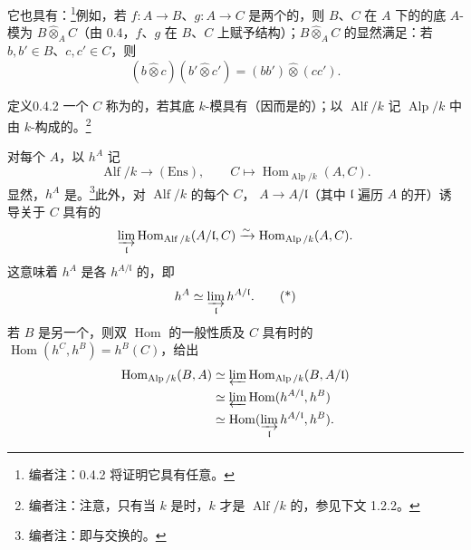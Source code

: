 它也具有：\footnote{编者注：0.4.2 将证明它具有任意。}例如，若 $f:A\to B$、$g:A\to C$ 是两个的，则 $B$、$C$ 在 $A$ 下的的底 $A$-模为 $B\widehat\otimes_A C$（由 0.4，$f$、$g$
在 $B$、$C$ 上赋予结构）；$B\widehat\otimes_A C$ 的显然满足：若 $b,b'\in B$、$c,c'\in C$，则
\[(b\widehat\otimes c)(b'\widehat\otimes c')=(bb')\widehat\otimes(cc').\]

\begin{SGAresult}{定义}{0.4.2}
一个 $C$ 称为的，若其底 $k$-模具有（因而是的）；以 $\operatorname{Alf}/k$ 记 $\operatorname{Alp}/k$ 中由 $k$-构成的。\footnote{编者注：注意，只有当 $k$ 是时，$k$ 才是 $\operatorname{Alf}/k$ 的，参见下文 1.2.2。}
\end{SGAresult}
对每个 $A$，以 $h^A$ 记
\[\operatorname{Alf}/k\longrightarrow(\mathrm{Ens}),\qquad C\longmapsto\operatorname{Hom}_{\operatorname{Alp}/k}(A,C).\]
显然，$h^A$ 是。\footnote{编者注：即与交换的。}此外，对 $\operatorname{Alf}/k$ 的每个 $C$， $A\to A/\mathfrak l$（其中 $\mathfrak l$ 遍历 $A$ 的开）诱导关于 $C$ 具有的
\[\varinjlim_{\mathfrak l}\operatorname{Hom}_{\operatorname{Alf}/k}(A/\mathfrak l,C)\xrightarrow{\sim}\operatorname{Hom}_{\operatorname{Alp}/k}(A,C).\]
这意味着 $h^A$ 是各 $h^{A/\mathfrak l}$ 的，即
\[h^A\simeq\varinjlim_{\mathfrak l}h^{A/\mathfrak l}.\tag{*}\]
若 $B$ 是另一个，则双 $\operatorname{Hom}$ 的一般性质及 $C$ 具有时的 $\operatorname{Hom}(h^C,h^B)=h^B(C)$，给出
\[
\begin{aligned}
\operatorname{Hom}_{\operatorname{Alp}/k}(B,A)
 &\simeq\varprojlim\operatorname{Hom}_{\operatorname{Alp}/k}(B,A/\mathfrak l)\\
 &\simeq\varprojlim\operatorname{Hom}(h^{A/\mathfrak l},h^B)\\
 &\simeq\operatorname{Hom}(\varinjlim_{\mathfrak l}h^{A/\mathfrak l},h^B).
\end{aligned}
\]
